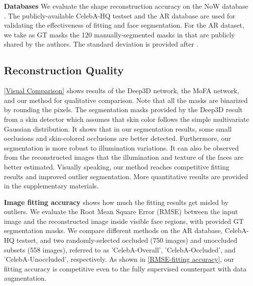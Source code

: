 \documentclass[10pt,twocolumn,letterpaper]{article}
\begin{document}
\textbf{Databases} We evaluate the shape reconstruction accuracy on the NoW database \cite{RingNet:CVPR:2019}. The publicly-available CelebA-HQ testset \cite{CELEBAHQ} and the AR database \cite{ARdataset} are used for validating the effectiveness of fitting and face segmentation. For the AR dataset, we take as GT masks the 120 manually-segmented masks in \cite{egger2018occlusion} that are publicly shared by the authors. The standard deviation is provided after .
  
 

  
\subsection{Reconstruction Quality}


\cref{Visual Comparison} shows results of the Deep3D network, the MoFA network, and our method for qualitative comparison. Note that all the masks are binarized by rounding the pixels. The segmentation masks provided by the Deep3D result from a skin detector which assumes that skin color follows the simple multivariate Gaussian distribution. It shows that in our segmentation results, some small occlusions and skin-colored occlusions are better detected. Furthermore, our segmentation is more robust to illumination variations. It can also be observed from the reconstructed images that the illumination and texture of the faces are better estimated. Visually speaking, our method reaches competitive fitting results and improved outlier segmentation. More quantitative results are provided in the supplementary materials.


\textbf{Image fitting accuracy} shows how much the fitting results get misled by outliers. We evaluate the Root Mean Square Error (RMSE) between the input image and the reconstructed image inside visible face regions, with provided GT segmentation masks.
We compare different methods on the AR database, CelebA-HQ testset, and two randomly-selected occluded (750 images) and unoccluded subsets (558 images), referred to as 'CelebA-Overall', 'CelebA-Occluded', and 'CelebA-Unoccluded', respectively. As shown in \cref{RMSE-fitting accuracy}, our fitting accuracy is competitive even to the fully supervised counterpart with data augmentation.
\end{document}
